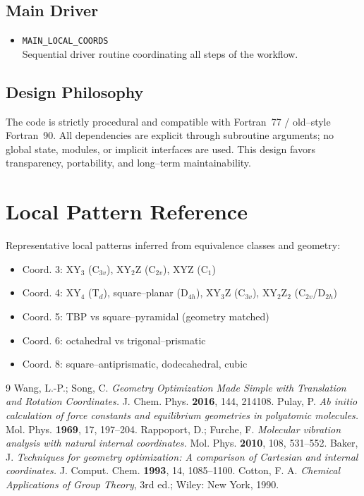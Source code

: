 \documentclass[11pt,a4paper]{article}
\begin{document}
\subsection{Main Driver}

\begin{itemize}
  \item \texttt{MAIN\_LOCAL\_COORDS} \\
  Sequential driver routine coordinating all steps of the workflow.
\end{itemize}

\subsection{Design Philosophy}

The code is strictly procedural and compatible with Fortran~77 / old--style
Fortran~90.
All dependencies are explicit through subroutine arguments; no global state,
modules, or implicit interfaces are used.
This design favors transparency, portability, and long--term maintainability.

\section{Local Pattern Reference}

Representative local patterns inferred from equivalence classes and geometry:
\begin{itemize}
  \item Coord. 3: XY$_3$ (C$_{3v}$), XY$_2$Z (C$_{2v}$), XYZ (C$_1$)
  \item Coord. 4: XY$_4$ (T$_d$), square--planar (D$_{4h}$), XY$_3$Z (C$_{3v}$),
        XY$_2$Z$_2$ (C$_{2v}$/D$_{2h}$)
  \item Coord. 5: TBP vs square--pyramidal (geometry matched)
  \item Coord. 6: octahedral vs trigonal--prismatic
  \item Coord. 8: square--antiprismatic, dodecahedral, cubic
\end{itemize}

\begin{thebibliography}{9}
Wang, L.-P.; Song, C.
\emph{Geometry Optimization Made Simple with Translation and Rotation Coordinates.}
J. Chem. Phys. \textbf{2016}, 144, 214108.
Pulay, P.
\emph{Ab initio calculation of force constants and equilibrium geometries in polyatomic molecules.}
Mol. Phys. \textbf{1969}, 17, 197--204.
Rappoport, D.; Furche, F.
\emph{Molecular vibration analysis with natural internal coordinates.}
Mol. Phys. \textbf{2010}, 108, 531--552.
Baker, J.
\emph{Techniques for geometry optimization: A comparison of Cartesian and internal coordinates.}
J. Comput. Chem. \textbf{1993}, 14, 1085--1100.
Cotton, F. A.
\emph{Chemical Applications of Group Theory}, 3rd ed.;
Wiley: New York, 1990.
\end{thebibliography}
\end{document}
